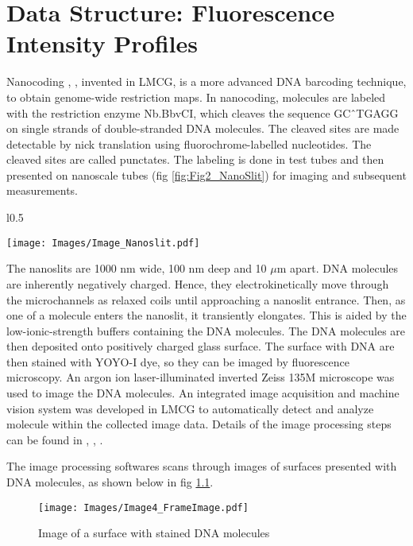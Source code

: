 \chapter{Data Structure: Fluorescence Intensity Profiles}

Nanocoding \cite{Jo_etal_2007_PNAS}, \cite{Jo_etal_2009}, invented in LMCG, is a more advanced DNA barcoding technique, to obtain genome-wide restriction maps. In nanocoding, molecules are labeled with the restriction enzyme Nb.BbvCI, which cleaves the sequence GC\^\ TGAGG on single strands of double-stranded DNA molecules. The cleaved sites are made detectable by nick translation using fluorochrome-labelled nucleotides. The cleaved sites are called punctates. The labeling is done in test tubes and then presented on nanoscale tubes (fig \ref{fig:Fig2_NanoSlit}) for imaging and subsequent measurements. 
\begin{wrapfigure}{l}{0.5\textwidth}
\begin{center}
\texttt{[image: Images/Image\_Nanoslit.pdf]}
\end{center}
\caption{Nanoslits where DNA molecules are presented}
\label{fig:Fig2_NanoSlit}
\end{wrapfigure}
The nanoslits are 1000 nm wide, 100 nm deep and 10 $\mu$m apart. DNA molecules are inherently negatively charged. Hence, they electrokinetically move through the microchannels as relaxed coils until approaching a nanoslit entrance. Then, as one of a molecule enters the nanoslit, it transiently elongates. This is aided by the low-ionic-strength buffers containing the DNA molecules. The DNA molecules are then deposited onto positively charged glass surface. The surface with DNA are then stained with YOYO-I dye, so they can be imaged by fluorescence microscopy. An argon ion laser-illuminated inverted Zeiss 135M microscope was used to image the DNA molecules. An integrated image acquisition and machine vision system was developed in LMCG to automatically detect and analyze molecule within the collected image data. Details of the image processing steps can be found in \cite{Dimalanta_etal_2004_AnalChem}, \cite{Jo_etal_2007_PNAS}, \cite{Ravindran_Gupta_2015_GigaScience}. 

The image processing softwares scans through images of surfaces presented with DNA molecules, as shown below in fig \ref{fig:Fig2_FrameImage}. 
\begin{figure}[h!]
\begin{center}
\texttt{[image: Images/Image4\_FrameImage.pdf]}
\end{center}
\caption{Image of a surface with stained DNA molecules}
\label{fig:Fig2_FrameImage}
\end{figure}



